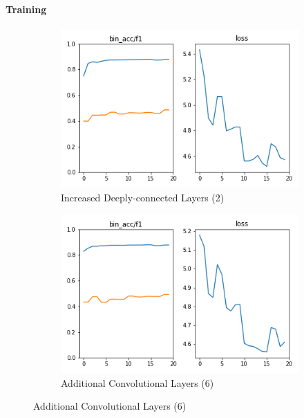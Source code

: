 \begin{frame}
	\frametitle{\secttitle}
	\framesubtitle{Training}
	\begin{figure}
		\centering
		\begin{subfigure}{0.5\textwidth}
			\centering
			\includegraphics[width=0.8\linewidth]{images/inc_deep_conn_lay.png}
			\caption{Increased Deeply-connected Layers (2)}
		\end{subfigure}%
		\begin{subfigure}{0.5\textwidth}
			\centering
			\includegraphics[width=0.8\linewidth]{images/even_more_conv.png}
			\caption{Additional Convolutional Layers (6)}
		\end{subfigure}
	\end{figure}
\end{frame}
